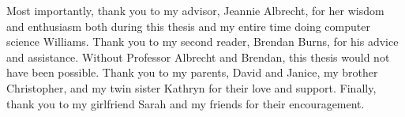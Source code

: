 Most importantly, thank you to my advisor, Jeannie Albrecht, for her wisdom and
enthusiasm both during this thesis and my entire time doing computer
science Williams. Thank you to my second reader, Brendan Burns, for his advice
and assistance. Without Professor Albrecht and Brendan, this thesis would not
have been possible. Thank you to my parents, David and Janice, my brother
Christopher, and my twin sister Kathryn for their love and support. Finally, thank you to
my girlfriend Sarah and my friends for their encouragement.

